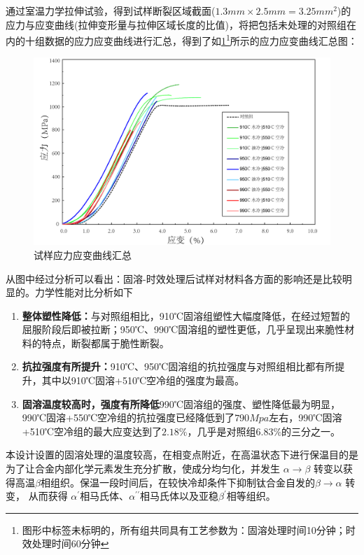 通过室温力学拉伸试验，得到试样断裂区域截面($ 1.3mm\times2.5mm=3.25mm^2 $)的应力与应变曲线(拉伸变形量与拉伸区域长度的比值)，将把包括未处理的对照组在内的十组数据的应力应变曲线进行汇总，得到了如\ref{fig:试样应力应变曲线汇总}\footnote{图形中标签未标明的，所有组共同具有工艺参数为：固溶处理时间10分钟；时效处理时间60分钟}所示的应力应变曲线汇总图：
\begin{figure}[h!]
	\centering
	\includegraphics[width=0.99\linewidth]{pic/试样应力应变曲线汇总min.png}
	\caption{试样应力应变曲线汇总}
	\label{fig:试样应力应变曲线汇总}
\end{figure}
从图中经过分析可以看出：固溶-时效处理后试样对材料各方面的影响还是比较明显的。力学性能对比分析如下
\begin{enumerate}
	\item \textbf{整体塑性降低：}与对照组相比，910℃固溶组塑性大幅度降低，在经过短暂的屈服阶段后即被拉断；950℃、990℃固溶组的塑性更低，几乎呈现出来脆性材料的特点，断裂都属于脆性断裂。
	\item \textbf{抗拉强度有所提升：}910℃、950℃固溶组的抗拉强度与对照组相比都有所提升，其中以910℃固溶+510℃空冷组的强度为最高。
	\item \textbf{固溶温度较高时，强度有所降低}990℃固溶组的强度、塑性降低最为明显，990℃固溶+550℃空冷组的抗拉强度已经降低到了$ 790Mpa $左右，990℃固溶+510℃空冷组的最大应变达到了$ 2.18\% $，几乎是对照组$ 6.83\% $的三分之一。
\end{enumerate}


本设计设置的固溶处理的温度较高，在相变点附近，在高温状态下进行保温目的是为了让合金内部化学元素发生充分扩散，使成分均匀化，并发生 $\alpha\to\beta$ 转变以获得高温$ \beta $相组织。保温一段时间后，在较快冷却条件下抑制钛合金自发的$\beta\to \alpha$ 转变， 从而获得 $ \alpha^{\prime} $相马氏体、$ \alpha^{\prime\prime} $相马氏体以及亚稳$ \beta^{\prime} $相等组织。

